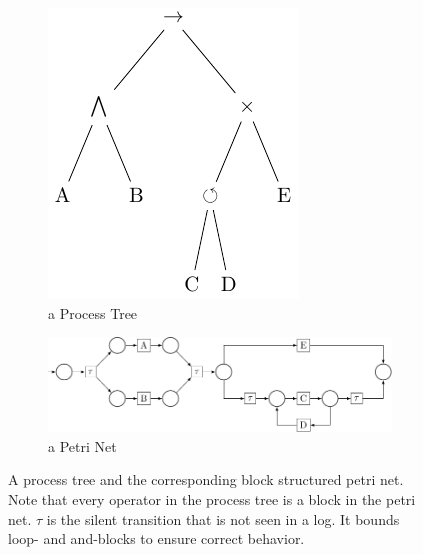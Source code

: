 \documentclass[
	a4paper,
	pagesize,
	pdftex,
	12pt,
	twoside, %
	BCOR=5mm, %
	ngerman,
	fleqn,
	final,
	]{scrartcl}
\begin{document}
\begin{figure}[h]
	\begin{subfigure}[t]{.5\textwidth}
	  \centering
	  \includegraphics[width=0.5\linewidth]{img/process-tree.pdf}
	  \caption{a Process Tree}
	  \label{fig:process_tree}
	\end{subfigure}
	\begin{subfigure}[t]{.5\textwidth}
	  \centering
	  	  \includegraphics[width=0.9\linewidth]{img/petri-net.pdf}
	  \caption{a Petri Net}
	  \label{fig:petri_net}
	\end{subfigure}
\caption{A process tree and the corresponding block structured petri net. Note that every operator in the process tree is a block in the petri net. $\tau$ is the silent transition that is not seen in a log. It bounds loop- and and-blocks to ensure correct behavior.}
\label{fig:processtree_petrinet}
\end{figure}
\end{document}

